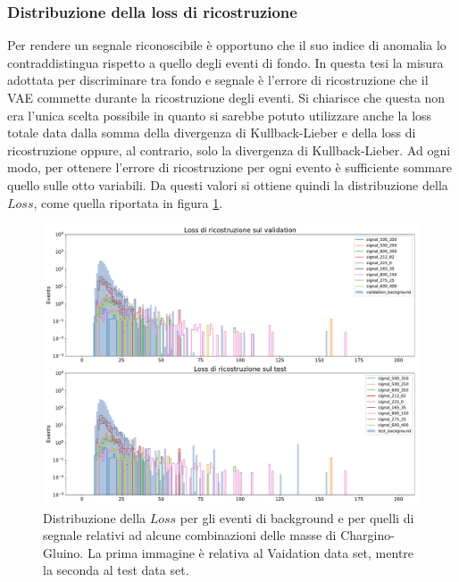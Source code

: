 \subsubsection{Distribuzione della loss di ricostruzione}
\label{reco_loss}

Per rendere un segnale riconoscibile è opportuno che il suo indice di anomalia lo contraddistingua rispetto a quello degli eventi di fondo. In questa tesi la misura adottata per discriminare tra fondo e segnale è l'errore di ricostruzione che il VAE commette durante la ricostruzione degli eventi. Si chiarisce che questa non era l'unica scelta possibile in quanto si sarebbe potuto utilizzare anche la loss totale data dalla somma della divergenza di Kullback-Lieber e della loss di ricostruzione oppure, al contrario, solo la divergenza di Kullback-Lieber. 
Ad ogni modo, per ottenere l'errore di ricostruzione per ogni evento è sufficiente sommare quello sulle otto variabili. Da questi valori si ottiene quindi la distribuzione della $\textit{Loss}$, come quella riportata in figura \ref{distribuzione_loss}. 

\begin{figure}[h!]
	\centering
	\includegraphics[width=0.99\textwidth]{figs/risultati_simulazione/distribuzioneLoss.pdf}
	\caption{Distribuzione della $\textit{Loss}$ per gli eventi di background e per quelli di segnale relativi ad alcune combinazioni delle masse di Chargino-Gluino. La prima immagine è relativa al Vaidation data set, mentre la seconda al test data set.}
	\label{distribuzione_loss}
\end{figure}

